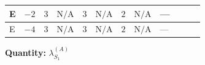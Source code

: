 \documentclass[8pt]{article}
\begin{document}
\begin{landscape}
\begin{longtable}{@{}llcccccc >{\raggedright\arraybackslash}p{0.21\linewidth} >{\raggedright\arraybackslash}p{0.21\linewidth} >{\raggedright\arraybackslash}p{0.21\linewidth}@{}}
\midrule
E & $-2$ & $3$ & $\text{N/A}$ & $3$ & $\text{N/A}$ & $2$ & $\text{N/A}$ & --- & \scriptsize\adjustbox{max width=\linewidth}{$\begin{gathered} -2 {g_2}^4\end{gathered}$} & \scriptsize\adjustbox{max width=\linewidth}{$\begin{gathered} -24 {g_2}^2 {\lambda_{S_1}^{(A)}}\end{gathered}$} \\
\midrule
E & $-4$ & $3$ & $\text{N/A}$ & $3$ & $\text{N/A}$ & $2$ & $\text{N/A}$ & --- & \scriptsize\adjustbox{max width=\linewidth}{$\begin{gathered} -2 {g_2}^4\end{gathered}$} & \scriptsize\adjustbox{max width=\linewidth}{$\begin{gathered} -24 {g_2}^2 {\lambda_{S_1}^{(A)}}\end{gathered}$} \\
\midrule
\bottomrule
\end{longtable}
\clearpage
\noindent\textbf{Quantity: }$\lambda_{S_1}^{(A)}$\par\smallskip

\end{landscape}
\end{document}
